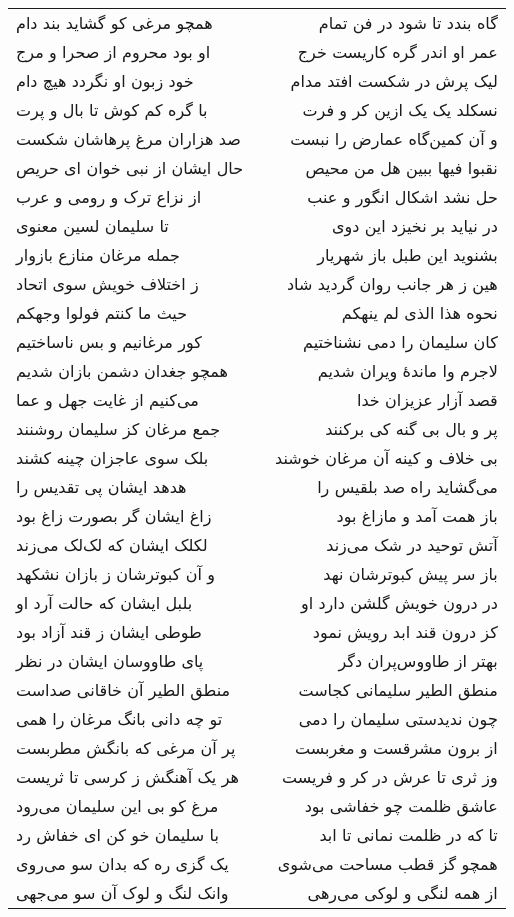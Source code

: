 \begin{center}
\begin{longtable}{l p{0.5cm} r}
همچو مرغی کو گشاید بند دام
&&
گاه بندد تا شود در فن تمام
\\
او بود محروم از صحرا و مرج
&&
عمر او اندر گره کاریست خرج
\\
خود زبون او نگردد هیچ دام
&&
لیک پرش در شکست افتد مدام
\\
با گره کم کوش تا بال و پرت
&&
نسکلد یک یک ازین کر و فرت
\\
صد هزاران مرغ پرهاشان شکست
&&
و آن کمین‌گاه عمارض را نبست
\\
حال ایشان از نبی خوان ای حریص
&&
نقبوا فیها ببین هل من محیص
\\
از نزاع ترک و رومی و عرب
&&
حل نشد اشکال انگور و عنب
\\
تا سلیمان لسین معنوی
&&
در نیاید بر نخیزد این دوی
\\
جمله مرغان منازع بازوار
&&
بشنوید این طبل باز شهریار
\\
ز اختلاف خویش سوی اتحاد
&&
هین ز هر جانب روان گردید شاد
\\
حیث ما کنتم فولوا وجهکم
&&
نحوه هذا الذی لم ینهکم
\\
کور مرغانیم و بس ناساختیم
&&
کان سلیمان را دمی نشناختیم
\\
همچو جغدان دشمن بازان شدیم
&&
لاجرم وا ماندهٔ ویران شدیم
\\
می‌کنیم از غایت جهل و عما
&&
قصد آزار عزیزان خدا
\\
جمع مرغان کز سلیمان روشنند
&&
پر و بال بی گنه کی برکنند
\\
بلک سوی عاجزان چینه کشند
&&
بی خلاف و کینه آن مرغان خوشند
\\
هدهد ایشان پی تقدیس را
&&
می‌گشاید راه صد بلقیس را
\\
زاغ ایشان گر بصورت زاغ بود
&&
باز همت آمد و مازاغ بود
\\
لکلک ایشان که لک‌لک می‌زند
&&
آتش توحید در شک می‌زند
\\
و آن کبوترشان ز بازان نشکهد
&&
باز سر پیش کبوترشان نهد
\\
بلبل ایشان که حالت آرد او
&&
در درون خویش گلشن دارد او
\\
طوطی ایشان ز قند آزاد بود
&&
کز درون قند ابد رویش نمود
\\
پای طاووسان ایشان در نظر
&&
بهتر از طاووس‌پران دگر
\\
منطق الطیر آن خاقانی صداست
&&
منطق الطیر سلیمانی کجاست
\\
تو چه دانی بانگ مرغان را همی
&&
چون ندیدستی سلیمان را دمی
\\
پر آن مرغی که بانگش مطربست
&&
از برون مشرقست و مغربست
\\
هر یک آهنگش ز کرسی تا ثریست
&&
وز ثری تا عرش در کر و فریست
\\
مرغ کو بی این سلیمان می‌رود
&&
عاشق ظلمت چو خفاشی بود
\\
با سلیمان خو کن ای خفاش رد
&&
تا که در ظلمت نمانی تا ابد
\\
یک گزی ره که بدان سو می‌روی
&&
همچو گز قطب مساحت می‌شوی
\\
وانک لنگ و لوک آن سو می‌جهی
&&
از همه لنگی و لوکی می‌رهی
\\
\end{longtable}
\end{center}
